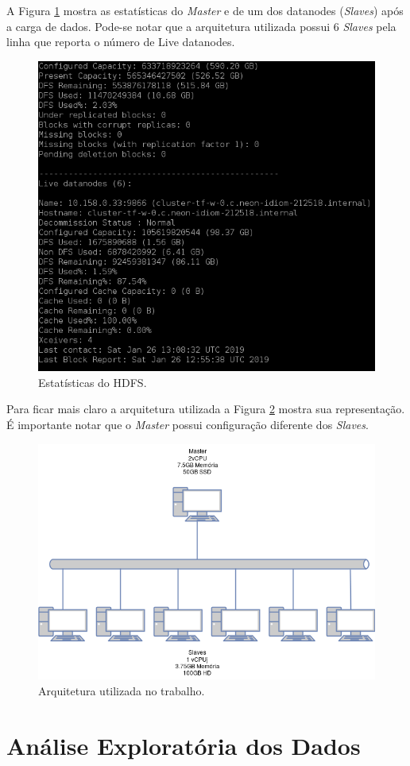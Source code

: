 \documentclass{article}
\begin{document}
A Figura \ref{fig:hdfs_data} mostra as estatísticas do \emph{Master} e de um dos datanodes (\emph{Slaves}) após a carga de dados. Pode-se notar que a arquitetura utilizada possui 6 \emph{Slaves} pela linha que reporta o número de Live datanodes.

\begin{figure}[H]
\centering
  \includegraphics[width=0.6 \linewidth]{img/hdfs-occupation.png}
  \caption{Estatísticas do HDFS.}
  \label{fig:hdfs_data}
\end{figure}

Para ficar mais claro a arquitetura utilizada a Figura \ref{fig:arch} mostra sua representação. É importante notar que o \emph{Master} possui configuração diferente dos \emph{Slaves}.

\begin{figure}[H]
\centering
  \includegraphics[width=0.8 \linewidth]{img/arch.png}
  \caption{Arquitetura utilizada no trabalho.}
  \label{fig:arch}
\end{figure}

\newpage
\section{Análise Exploratória dos Dados}
\label{sect:expl_anal}
\end{document}
